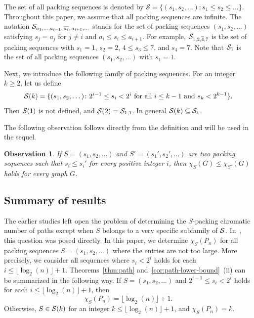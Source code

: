 \documentclass[12pt]{article}
\newtheorem{observation}[theorem]{Observation}
\newcommand{\cS}{{\cal S}}
\begin{document}
The set of all packing sequences is denoted by $\mathcal{S}= \{(s_1, s_2, ...): s_1 \le s_2 \le ...\}$. Throughout this paper, we assume that all packing sequences are infinite. The notation $\cS_{a_1,\ldots,a_{i-1},\,\overline{a_i},\,a_{i+1},\ldots}$ 
stands for the set of packing sequences $(s_1,s_2,\ldots)$ satisfying $s_j=a_j$ for $j\ne i$ 
and $a_i \le s_i \le a_{i+1}$. For example, ${\cal S}_{1,2,\overline{4},7}$ is the set of packing sequences with $s_1=1$, $s_2=2$, $4\le s_3\le 7$, and $s_4=7$. Note that $\cS_1$ is the set of all packing sequences $(s_1,s_2,\ldots)$ with $s_1=1$. 


Next, we introduce the following family of packing sequences. For an integer $k \ge 2$, let us define
\begin{equation} \label{eq:def-S-k}
    \cS(k)= \{(s_1, s_2, \dots ) \colon  2^{i-1} \leq s_i <2^i \mbox{ for all } i \leq k-1 \mbox{ and } s_k < 2^{k-1} \}.
    \end{equation}
    Then $\cS(1)$ is not defined, and $\cS(2)= \cS_{1,1}$. In general $\cS(k) \subseteq \cS_1$. 
\medskip 

The following observation follows directly from the definition and will be used in the sequel.

\begin{observation} \label{obs:basic}
   If $S=(s_1, s_2, \dots )$ and $S'=(s_1', s_2', \dots )$ are two packing sequences such that $s_i \leq s_i'$ for every positive integer $i$, then $\chi_S(G) \leq \chi_{S'}(G)$ holds for every graph $G$.
\end{observation}
\subsection{Summary of results}

The earlier studies left open the problem of determining the $S$-packing chromatic number of paths except when $S$ belongs to a very specific subfamily of $\cS$. In~\cite{ekinci-2026}, this question was posed directly. In this paper, we determine $\chi_S(P_n)$ for all packing sequences $S=(s_1,s_2, \dots)$ where the entries are not too large. More precisely, we consider all sequences where $s_i < 2^i$ holds for each  $i \leq \lfloor \log_2(n) \rfloor +1$. Theorems~\ref{thm:path} and~\ref{cor:path-lower-bound}~(ii) can be summarized in the following way.
If $S=(s_1, s_2, \dots)$ and $2^{i-1} \leq s_i < 2^i$ holds for each  $ i \leq \lfloor \log_2(n) \rfloor +1$, then 
$$\chi_S(P_n)= \lfloor \log_2(n) \rfloor +1.
$$
Otherwise, $S \in \cS(k)$ for an integer $k \leq \lfloor \log_2(n) \rfloor +1$, and
$ \chi_S(P_n)= k$.
\end{document}
